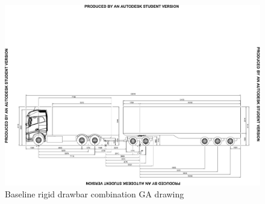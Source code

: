 \begin{landscape}\centering
	\vspace*{\fill}
\begin{figure}[H]
	\centering
	\includegraphics[width=1.3\textwidth]{fig/baseline_ga_rigid-drawbar}
	\caption{Baseline rigid drawbar combination GA drawing}
	\label{figure:baseline-ga-rigid-drawbar-combination}
\end{figure}
	\vfill
\end{landscape}

\restoregeometry